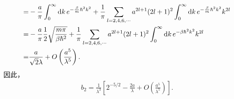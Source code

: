 \documentclass{assignment}
\begin{document}
\begin{sol}
\begin{itemize}
\begin{align}
            \notag=&-\frac{a}{\pi}\int_0^{\infty}\mathrm{d}k\,e^{-\frac{\beta}{m}\hbar^2k^2}+\frac{1}{\pi}\sum_{l=2,4,6,\cdots}a^{2l+1}(2l+1)^2\int_0^{\infty}\mathrm{d}k\,e^{-\frac{\beta}{m}\hbar^2k^2}k^{2l}\\
            \notag=&-\frac{a}{\pi}\frac{1}{2}\sqrt{\frac{m\pi}{\beta\hbar^2}}+\frac{1}{\pi}\sum_{l=2,4,6,\cdots}a^{2l+1}(2l+1)^2\int_0^{\infty}\mathrm{d}k\,e^{-\beta\hbar^2k^2}k^{2l}\\
            =&\frac{a}{\sqrt{2}\lambda}+O\left(\frac{a^5}{\lambda^5}\right).
        \end{align}
        因此，
        \begin{align}
            b_2=\frac{1}{\lambda^3}\left[2^{-5/2}-\frac{2a}{\lambda}+O\left(\frac{a^5}{\lambda^5}\right)\right].
        \end{align}
    \end{itemize}
\end{sol}
\end{document}

